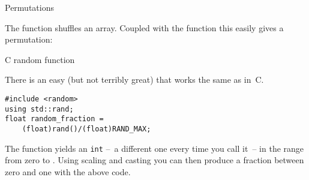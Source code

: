 \begin{comment}
  \Level 1 {Exercise}

  A \indextermbus{random}{walk} is a process
  where a position gets updated every time step.
  Every update is a displacement over a unit distance,
  in some random direction:
  \[ p_{i+1} = p_i + \overrightarrow r, \qquad \left|r\right|=1. \]

  This was originally invented as a way of modeling the spread of mosquitos:
  if a mosquito flies the same distance every day, but in a random direction,
  how far can it reach in its life span.

  \begin{exercise}
    Make \lstinline{Mosquito} class with a \lstinline{step} method.
    Calling this method updates the position of the mosquito
    by a random unit distance.
    Make the class so that the location can be in any number of dimensions.

    The main problem here is to compute the random displacement.
    \begin{itemize}
    \item You can use trigoniometric functions to compute a point on the unit sphere.
    \item You also generate a point in a unit cube, and project it on the unit sphere.
    \end{itemize}
    In both cases, you have to be careful to let the points be uniform.
  \end{exercise}

  When you're convinced that your code is correct, explore the mathematics:

  \begin{exercise}
    Explore how far a mosquito can get from its starting point in $N$ days.
    Does this depend on the dimensionality~$d$?

    You may need to repeat every experiment a number of times
    to make it statistically significant.
  \end{exercise}
\end{comment}

 {Permutations}

The function  shuffles an array.
Coupled with the  function this easily gives a permutation:


 {C random function}
\label{sec:crand}

There is an easy (but not terribly great)
that works the same as in~C.
%
\begin{lstlisting}
#include <random>
using std::rand;
float random_fraction =
    (float)rand()/(float)RAND_MAX;
\end{lstlisting}
%
The function  yields an \lstinline{int}
--~a different one every time you call it~--
in the range from zero to .
Using scaling and casting you can then produce a fraction between zero
and one with the above code.

